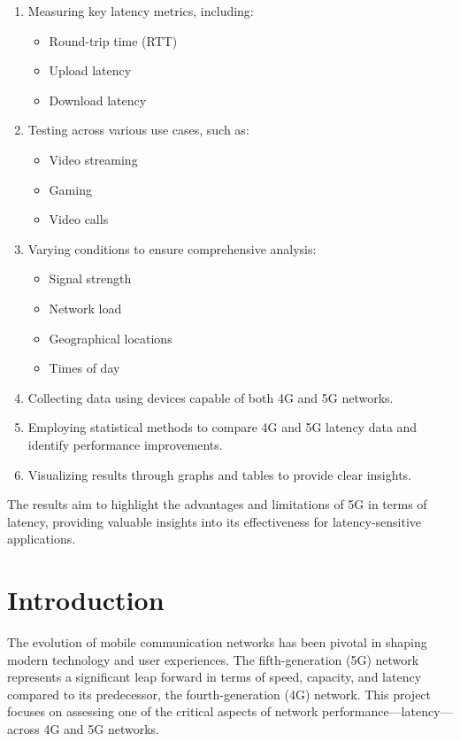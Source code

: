 \documentclass[conference]{IEEEtran}
\begin{document}
\begin{enumerate}
    \item Measuring key latency metrics, including:
    \begin{itemize}
        \item Round-trip time (RTT)
        \item Upload latency
        \item Download latency
    \end{itemize}
    \item Testing across various use cases, such as:
    \begin{itemize}
        \item Video streaming
        \item Gaming
        \item Video calls
    \end{itemize}
    \item Varying conditions to ensure comprehensive analysis:
    \begin{itemize}
        \item Signal strength
        \item Network load
        \item Geographical locations
        \item Times of day
    \end{itemize}
    \item Collecting data using devices capable of both 4G and 5G networks.
    \item Employing statistical methods to compare 4G and 5G latency data and identify performance improvements.
    \item Visualizing results through graphs and tables to provide clear insights.
\end{enumerate}

The results aim to highlight the advantages and limitations of 5G in terms of latency, providing valuable insights into its effectiveness for latency-sensitive applications.

\section{Introduction}
The evolution of mobile communication networks has been pivotal in shaping modern technology and user experiences. The fifth-generation (5G) network represents a significant leap forward in terms of speed, capacity, and latency compared to its predecessor, the fourth-generation (4G) network. This project focuses on assessing one of the critical aspects of network performance—latency—across 4G and 5G networks.
\end{document}

